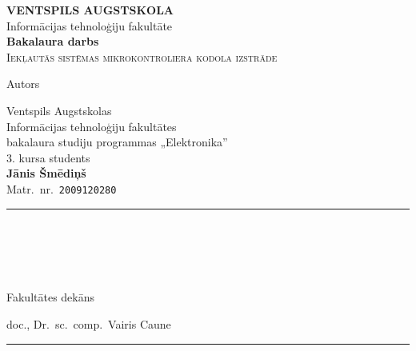 \begin{titlepage}
	\centering
	\Large\MakeUppercase{\textbf{Ventspils Augstskola}}\\
	\large Informācijas tehnoloģiju fakultāte\\[2cm]
	
	\textbf{Bakalaura darbs}\\[1.5cm]
	
	\textsc{\LARGE Iekļautās sistēmas mikrokontroliera kodola izstrāde}
	\vfill %
	
	\normalsize
	\begin{minipage}[t]{0.4\textwidth}
		\begin{flushleft}
			Autors
		\end{flushleft}
	\end{minipage}
	\begin{minipage}[t]{0.55\textwidth}
		\begin{flushleft}
			Ventspils Augstskolas \\
			Informācijas tehnoloģiju fakultātes \\
			bakalaura studiju programmas „Elektronika”\\
			3. kursa students \\
			\textbf{Jānis Šmēdiņš}\\
			Matr.~nr.~\texttt{2009120280}\\
			\rule[-1em]{10em}{0.3pt}\\
			\\[1cm]
		\end{flushleft}
	\end{minipage}\\[2em]
	\begin{minipage}[t]{0.4\textwidth}
		\begin{flushleft}
			Fakultātes dekāns
		\end{flushleft}
	\end{minipage}
	\begin{minipage}[t]{0.55\textwidth}
		\begin{flushleft}
			doc., Dr.~sc.~comp.~Vairis Caune\\[1ex]
			\rule[-1em]{10em}{0.3pt}\\
			\makebox[10em][c]{\tiny (paraksts)}\\[1cm]
		\end{flushleft}
	\end{minipage}\\[2em]

\end{titlepage}
